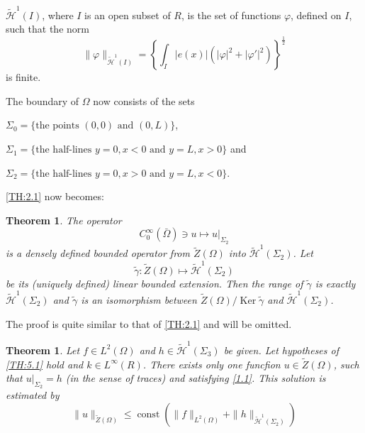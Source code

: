 \documentclass[a4paper,12pt,leqno]{article}
\newtheorem{theorem}[proposition]{Theorem}
\numberwithin{equation}{section}
\DeclareMathOperator{\Ker}{Ker}
\begin{document}
\newpage

$\tilde{\mathscr{H}}^{1}(I)$, where $I$ is an open subset of $R$, is the set of functions $\varphi$, defined on $I$, such that the norm
\begin{equation} \label{A3}
	\|\varphi\|_{\tilde{\mathscr{H}}^1(I)} =\left\{ \int_{I} |e(x)| 
	\left(|\varphi|^2+|\varphi'|^2\right)
	\right\}^{\frac{1}{2}}
\end{equation}
is finite.

The boundary of $\Omega$ now consists of the sets

$\Sigma_{0}=\{ \text{the points } (0,0) \text{ and } (0, L)\}$, 

$\Sigma_{1}=\{ \text{the half-lines } y=0, x<0 \text{ and } y=L, x>0\}$ and 

$\Sigma_{2}=\{ \text{the half-lines } y=0, x>0 \text{ and } y=L, x<0\}$.

\noindent
\cref{TH:2.1} now becomes:
\begin{theorem} \label{TH:A.1}
	The operator
	\begin{equation}
		C_{0}^{\infty}(\bar{\Omega}) \ni u \mapsto u|_{\Sigma_2}
	\end{equation}
	is a densely defined bounded operator from $\tilde{Z}(\Omega)$ into $\tilde{\mathscr{H}}^{1}\left(\Sigma_{2}\right)$. Let
	\begin{equation}
		\tilde{\gamma}: \tilde{Z}(\Omega) \mapsto \tilde{\mathscr{H}}^{1}\left(\Sigma_{2}\right)
	\end{equation}
	be its (uniquely defined) linear bounded extension. Then the range of $\tilde{\gamma}$ is exactly $\tilde{\mathscr{H}}^{1}\left(\Sigma_{2}\right)$ and $\tilde{\gamma}$ is an isomorphism between $\tilde{Z}(\Omega) / \Ker \tilde{\gamma}$ and $\tilde{\mathscr{H}}^{1}\left(\Sigma_{2}\right)$.
\end{theorem}

The proof is quite similar to that of \cref{TH:2.1} and will be omitted.

\begin{theorem}
	Let $f \in L^{2}(\Omega)$ and $h \in \tilde{\mathscr{H}}^{1}\left(\Sigma_{3}\right)$ be given. Let hypotheses of \cref{TH:5.1} hold and $k \in L^{\infty}(R)$. There exists only one funcfion $u \in \tilde{Z}(\Omega)$, such that $\left.u\right|_{\Sigma_{2}}=h$ (in the sense of traces) and satisfying \eqref{1.1}. This solution is estimated by
	\begin{equation}		
		\|u\|_{\tilde{Z}(\Omega)} 
		\leqslant 
		\operatorname{const}
		\left(
		\|f\|_{L^2(\Omega)} + 
		\|h\|_{\tilde{\mathscr{H}}^1(\Sigma_2)}
		\right)
	\end{equation}
\end{theorem}
\end{document}
